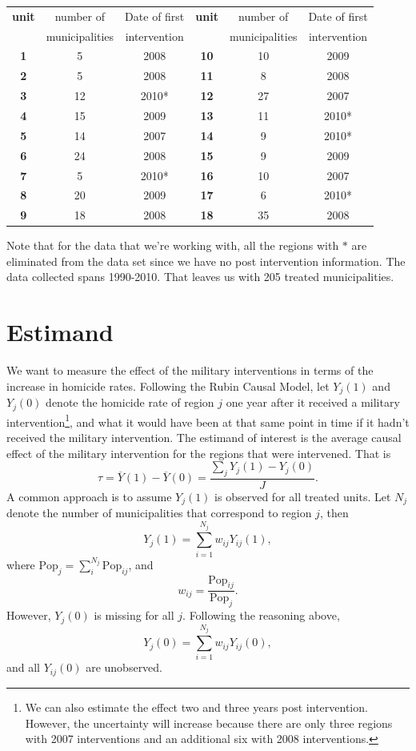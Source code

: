 \documentclass{article}[11 pt]
\begin{document}
\begin{table}[ht]
\begin{center}
\begin{tabular}{ccc|ccc}
  \hline
 \textbf{unit}& number of& Date of first &  \textbf{unit}& number of& Date of first \\ 
 & municipalities& intervention& & municipalities& intervention \\ 
  \hline
\textbf{1} &   5 & 2008 &  \textbf{10} &10 & 2009 \\ 
  \textbf{2} &   5 & 2008 &  \textbf{11} & 8 & 2008 \\ 
  \textbf{3} &  12 & 2010* &  \textbf{12} &27 & 2007 \\ 
  \textbf{4} &  15 & 2009 &  \textbf{13} &11 & 2010* \\ 
  \textbf{5} &  14 & 2007 &   \textbf{14} &9 & 2010* \\ 
  \textbf{6} &  24 & 2008 &   \textbf{15} &9 & 2009 \\ 
  \textbf{7} &   5 & 2010* &  \textbf{16} &10 & 2007 \\ 
  \textbf{8} &  20 & 2009 &   \textbf{17} &6 & 2010* \\ 
  \textbf{9} &  18 & 2008 &  \textbf{18} &35 & 2008 \\ 
   \hline
\end{tabular}
\end{center}
\end{table}

Note that for the data that we're working with, all the regions with $*$ are eliminated from the data set since we have no post intervention information. The data collected spans 1990-2010. That leaves us with 205 treated municipalities.

\section{Estimand}
We want to measure the effect of the military interventions in terms of the increase in homicide rates. Following the Rubin Causal Model, let $Y_j(1)$ and $Y_j(0)$ denote the homicide rate of region $j$ one year after it received a military intervention\footnote{We can also estimate the effect two and three years post intervention. However, the uncertainty will increase because there are only three regions with 2007 interventions and an additional six with 2008 interventions.}, and what it would have been at that same point in time if it hadn't received the military intervention. The estimand of interest is the average causal effect of the military intervention for the regions that were intervened. That is $$\tau=\overline{Y}(1)-\overline{Y}(0)=\frac{\sum_j Y_j(1)-Y_j(0)}{J}.$$ %
A common approach is to assume $Y_j(1)$ is observed for all treated units. Let $N_j$ denote the number of municipalities that correspond to region $j$, then 
$$Y_j(1) = \sum_{i=1}^{N_j}w_{ij}Y_{ij}(1),$$
where  $\textrm{Pop}_{j}= \sum_i^{N_j}\textrm{Pop}_{ij}$, and $$w_{ij}= \frac{\textrm{Pop}_{ij}}{\textrm{Pop}_{j}}.$$ 
However, $Y_j(0)$ is missing for all $j$. Following the reasoning above, $$Y_j(0) = \sum_{i=1}^{N_j}w_{ij}Y_{ij}(0),$$ and all $Y_{ij}(0)$ are unobserved.
\end{document}
